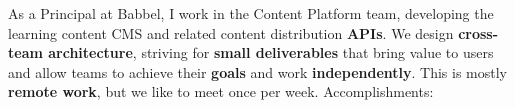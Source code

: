 \documentclass[10pt,a4paper,ragged2e,withhyper]{altacv}
\begin{document}
\begin{paracol}{2}



{\RaggedRight
As a Principal at Babbel, I work in the Content Platform team, developing the learning content CMS and related content distribution \textbf{APIs}. We design \textbf{cross-team architecture}, striving for \textbf{small deliverables} that bring value to users and allow teams to achieve their \textbf{goals} and work \textbf{independently}. This is mostly \textbf{remote work}, but we like to meet once per week. Accomplishments:

}
\end{paracol}
\end{document}
